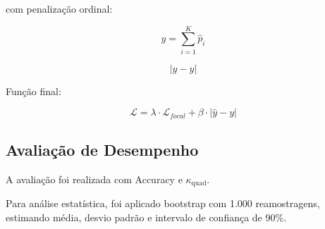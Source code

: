 com penalização ordinal:

\[
\hat{y} = \sum_{i=1}^{K} \hat{p}_i
\]

\[
|\hat{y} - y|
\]

Função final:

\[
\mathcal{L} = \lambda \cdot \mathcal{L}_{focal} + \beta \cdot |\hat{y} - y|
\]

\subsection{Avaliação de Desempenho}

A avaliação foi realizada com Accuracy e $\kappa_{\text{quad}}$.

Para análise estatística, foi aplicado bootstrap com 1.000 reamostragens, estimando média, desvio padrão e intervalo de confiança de 90\%.